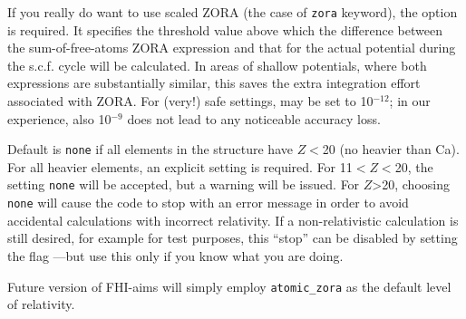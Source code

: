 If you really do want to use scaled ZORA (the case of \texttt{zora}
keyword), the  option is required.
It specifies the threshold value above which the difference between
the sum-of-free-atoms ZORA expression and that for the actual
potential during the s.c.f. cycle will be calculated. In areas of
shallow potentials, where both expressions are substantially similar,
this saves the extra integration effort associated with ZORA. For
(very!) safe settings,  may be set to 10$^{-12}$; in
our experience, also 10$^{-9}$ does not lead to any noticeable
accuracy loss. 

Default is \texttt{none} if all elements in the structure have $Z<$20
(no heavier than Ca). For all heavier elements, an explicit
 setting is required. For 11$<Z<$20, the setting
\texttt{none} will be accepted, but a
warning will be issued. For $Z$>20, choosing \texttt{none} will cause
the code to stop with an error message in order to avoid accidental
calculations with incorrect relativity. If a non-relativistic
calculation is still desired, for example for test purposes, this
``stop'' can be disabled by setting the flag
---but use this only if you know what
you are doing.

Future version of FHI-aims will simply employ \texttt{atomic\_zora} as
the default level of relativity.
